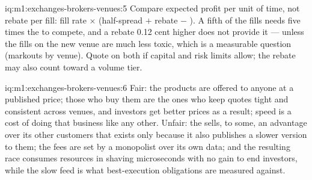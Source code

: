 \begin{solution}{iq:m1:exchanges-brokers-venues:5}
Compare expected profit per unit of time, not rebate per fill: fill rate
$\times$ (half-spread $+$ rebate $-$ ). A fifth of the
fills needs five times the  to compete, and a rebate 0.12 cent
higher does not provide it --- unless the fills on the new venue are much
less toxic, which is a measurable question (markouts by venue). Quote on
both if capital and risk limits allow; the rebate may also count toward a
volume tier.
\end{solution}

\begin{solution}{iq:m1:exchanges-brokers-venues:6}
Fair: the products are offered to anyone at a published price; those who buy
them are the ones who keep quotes tight and consistent across venues, and
investors get better prices as a result; speed is a cost of doing that
business like any other. Unfair: the  sells, to some, an advantage
over its other customers that exists only because it also publishes a slower
version to them; the fees are set by a monopolist over its own data; and the
resulting race consumes resources in shaving microseconds with no gain to
end investors, while the slow feed is what best-execution obligations are
measured against.
\end{solution}
